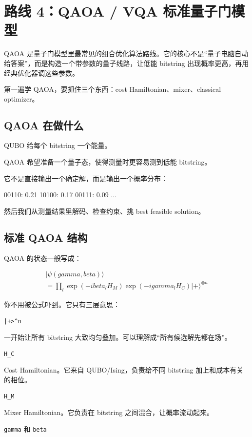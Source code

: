 \documentclass[UTF8,12pt,a4paper]{ctexart}
\begin{document}
\section*{路线 4：QAOA / VQA 标准量子门模型}

QAOA 是量子门模型里最常见的组合优化算法路线。它的核心不是“量子电脑自动给答案”，而是构造一个带参数的量子线路，让低能 bitstring 出现概率更高，再用经典优化器调这些参数。

第一遍学 QAOA，要抓住三个东西：cost Hamiltonian、mixer、classical optimizer。

\subsection*{QAOA 在做什么}

QUBO 给每个 bitstring 一个能量。

QAOA 希望准备一个量子态，使得测量时更容易测到低能 bitstring。

它不是直接输出一个确定解，而是输出一个概率分布：

\begin{GuideVerbatim}
00110: 0.21
10100: 0.17
00111: 0.09
...
\end{GuideVerbatim}

然后我们从测量结果里解码、检查约束、挑 best feasible solution。

\subsection*{标准 QAOA 结构}

QAOA 的状态一般写成：

\[
\begin{aligned}
|\psi(gamma, beta)\rangle\\
= \prod_{l} \exp(-i beta_{l} H_{M}) \exp(-i gamma_{l} H_{C}) |+\rangle^{\otimes n}
\end{aligned}
\]

你不用被公式吓到。它只有三层意思：

\texttt{|+>\textasciicircum{}n}

一开始让所有 bitstring 大致均匀叠加。可以理解成“所有候选解先都在场”。

\texttt{H\_C}

Cost Hamiltonian。它来自 QUBO/Ising，负责给不同 bitstring 加上和成本有关的相位。

\texttt{H\_M}

Mixer Hamiltonian。它负责在 bitstring 之间混合，让概率流动起来。

\texttt{gamma} 和 \texttt{beta}
\end{document}
